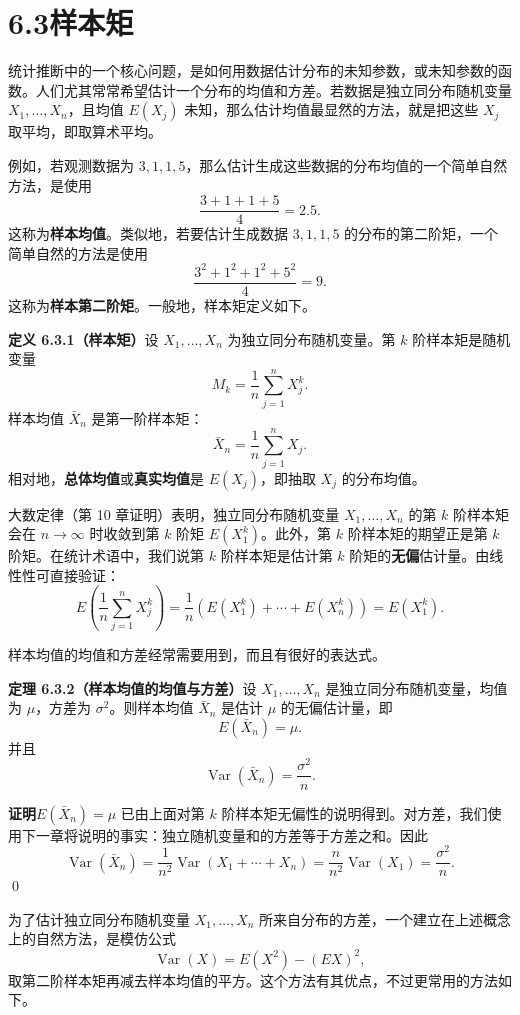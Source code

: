 \documentclass[UTF8, 12pt, fontset=fandol, oneside]{ctexart}
\begin{document}
\section*{6.3\quad 样本矩}

统计推断中的一个核心问题，是如何用数据估计分布的未知参数，或未知参数的函数。人们尤其常常希望估计一个分布的均值和方差。若数据是独立同分布随机变量 $X_1,\ldots,X_n$，且均值 $E(X_j)$ 未知，那么估计均值最显然的方法，就是把这些 $X_j$ 取平均，即取算术平均。

例如，若观测数据为 $3,1,1,5$，那么估计生成这些数据的分布均值的一个简单自然方法，是使用
\[
  \frac{3+1+1+5}{4}=2.5.
\]
这称为\textbf{样本均值}。类似地，若要估计生成数据 $3,1,1,5$ 的分布的第二阶矩，一个简单自然的方法是使用
\[
  \frac{3^2+1^2+1^2+5^2}{4}=9.
\]
这称为\textbf{样本第二阶矩}。一般地，样本矩定义如下。

\noindent\textbf{定义 6.3.1（样本矩）}\quad 设 $X_1,\ldots,X_n$ 为独立同分布随机变量。第 $k$ 阶样本矩是随机变量
\[
  M_k=\frac1n\sum_{j=1}^n X_j^k.
\]
样本均值 $\bar X_n$ 是第一阶样本矩：
\[
  \bar X_n=\frac1n\sum_{j=1}^n X_j.
\]
相对地，\textbf{总体均值}或\textbf{真实均值}是 $E(X_j)$，即抽取 $X_j$ 的分布均值。

大数定律（第 10 章证明）表明，独立同分布随机变量 $X_1,\ldots,X_n$ 的第 $k$ 阶样本矩会在 $n\to\infty$ 时收敛到第 $k$ 阶矩 $E(X_1^k)$。此外，第 $k$ 阶样本矩的期望正是第 $k$ 阶矩。在统计术语中，我们说第 $k$ 阶样本矩是估计第 $k$ 阶矩的\textbf{无偏}估计量。由线性性可直接验证：
\[
  E\left(\frac1n\sum_{j=1}^nX_j^k\right)
  =
  \frac1n\left(E(X_1^k)+\cdots+E(X_n^k)\right)
  =
  E(X_1^k).
\]

样本均值的均值和方差经常需要用到，而且有很好的表达式。

\noindent\textbf{定理 6.3.2（样本均值的均值与方差）}\quad 设 $X_1,\ldots,X_n$ 是独立同分布随机变量，均值为 $\mu$，方差为 $\sigma^2$。则样本均值 $\bar X_n$ 是估计 $\mu$ 的无偏估计量，即
\[
  E(\bar X_n)=\mu.
\]
并且
\[
  \operatorname{Var}(\bar X_n)=\frac{\sigma^2}{n}.
\]

\noindent\textbf{证明}\quad $E(\bar X_n)=\mu$ 已由上面对第 $k$ 阶样本矩无偏性的说明得到。对方差，我们使用下一章将说明的事实：独立随机变量和的方差等于方差之和。因此
\[
  \operatorname{Var}(\bar X_n)
  =
  \frac1{n^2}\operatorname{Var}(X_1+\cdots+X_n)
  =
  \frac{n}{n^2}\operatorname{Var}(X_1)
  =
  \frac{\sigma^2}{n}.
\]
\qed

为了估计独立同分布随机变量 $X_1,\ldots,X_n$ 所来自分布的方差，一个建立在上述概念上的自然方法，是模仿公式
\[
  \operatorname{Var}(X)=E(X^2)-(EX)^2,
\]
取第二阶样本矩再减去样本均值的平方。这个方法有其优点，不过更常用的方法如下。
\end{document}
